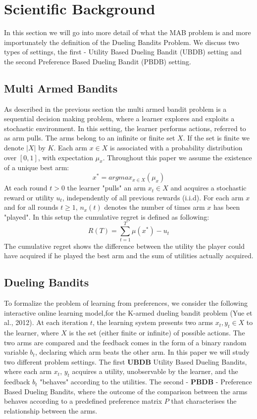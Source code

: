 \documentclass{llncs}
\begin{document}
\section{Scientific Background}
	In this section we will go into more detail of what the MAB problem is and more importunately the definition of the Dueling Bandits Problem. 
	We discuss two types of settings, the first - Utility Based Dueling Bandit (UBDB) setting and the second Preference Based Dueling Bandit (PBDB) setting.
	\subsection{Multi Armed Bandits}
	As described in the previous section the multi armed bandit problem is a sequential decision making problem, where a learner explores and exploits a stochastic environment. 
	In this setting, the learner performs actions, referred to as arm pulls. 
	The arms belong to an infinite or finite set $X$. 
	If the set is finite we denote $|X|$ by $K$. 
	Each arm $x \in X$ is associated with a probability distribution over $[0, 1]$, with expectation $\mu_{x}$. 
	Throughout this paper we assume the existence of a unique best arm:
	$$ x^* = argmax_{x \in X}(\mu_{x})$$
	At each round $t > 0$ the learner "pulls" an arm $x_t \in X$ and acquires a stochastic reward or utility $u_t$, independently of all previous rewards (i.i.d). 
	For each arm $x$ and for all rounds $t \geq 1$,  $n_{x}(t)$ denotes the number of times arm $x$ has been "played".
	In this setup the cumulative regret is defined as following:
	$$
	R(T) = \sum_{t=1}^{T} \mu(x^*) - u_t 
	$$ 
	The cumulative regret shows the difference between the utility the player could have acquired if he played the best arm and the sum of utilities actually acquired.
	\subsection{Dueling Bandits}
		To formalize the problem of learning from preferences, we consider the following interactive online learning model,for the K-armed dueling bandit problem (Yue et al., 2012).
		At each iteration $t$, the learning system presents two arms $x_t, y_t \in X$ to the learner, where $X$ is the set (either finite or infinite) of possible actions. The two arms are compared and the feedback comes in the form of a binary random variable $b_t$, declaring which arm beats the other arm.
		In this paper we will study two different problem settings.
		The first \textbf{UBDB} Utility Based Dueling Bandits, where each arm $x_t$, $y_t$ acquires a utility, unobservable by the learner, and the feedback $b_t$ "behaves" according to the utilities. 
		The second - \textbf{PBDB} - Preference Based Dueling Bandits, where the outcome of the comparison between the arms behaves according to a predefined preference matrix $P$ that characterises the relationship between the arms.
\end{document}
